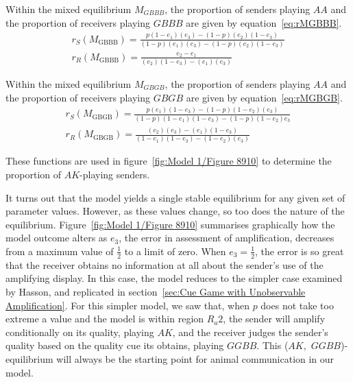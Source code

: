 \documentclass[a4paper,12pt]{article}
\numberwithin{equation}{section}
\begin{document}
Within the mixed equilibrium $M_{GBBB}$, the proportion of senders playing $AA$ and the proportion of receivers playing $GBBB$ are given by equation~\ref{eq:rMGBBB}.
\begin{subequations}
\label{eq:rMGBBB}
\begin{gather}
r_{S}(M_{\text{GBBB}})=\frac{p(1-e_{1})(e_{3})-(1-p)(e_{2})(1-e_{3})}{(1-p)(e_{1})(e_{3})-(1-p)(e_{2})(1-e_{3})}\\
r_{R}(M_{\text{GBBB}})=\frac{e_{2}-e_{1}}{(e_{2})(1-e_{3})-(e_{1})(e_{3})}
\end{gather}
\end{subequations}

Within the mixed equilibrium $M_{GBGB}$, the proportion of senders playing $AA$ and the proportion of receivers playing $GBGB$ are given by equation~\ref{eq:rMGBGB}.
\begin{subequations}
\label{eq:rMGBGB}
\begin{gather}
r_{S}(M_{\text{GBGB}})=\frac{p(e_{1})(1-e_{3})-(1-p)(1-e_{2})(e_{3})}{(1-p)(1-e_{1})(1-e_{3})-(1-p)(1-e_{2})e_{3}}\\
r_{R}(M_{\text{GBGB}})=\frac{(e_{2})(e_{3})-(e_{1})(1-e_{3})}{(1-e_{1})(1-e_{3})-(1-e_{2})(e_{3})}
\end{gather}
\end{subequations}

These functions are used in figure~\ref{fig:Model 1/Figure 8910} to determine the proportion of $AK$-playing senders.

It turns out that the model yields a single stable equilibrium for any given set of parameter values. However, as these values change, so too does the nature of the equilibrium. Figure~\ref{fig:Model 1/Figure 8910} summarises graphically how the model outcome alters as $e_{3}$, the error in assessment of amplification, decreases from a maximum value of $\frac{1}{2}$ to a limit of zero. When $e_{3}=\frac{1}{2}$, the error is so great that the receiver obtains no information at all about the sender's use of the amplifying display. In this case, the model reduces to the simpler case examined by Hasson, and replicated in section~\ref{sec:Cue Game with Unobservable Amplification}. For this simpler model, we saw that, when $p$ does not take too extreme a value and the model is within region $R_{a}2$, the sender will amplify conditionally on its quality, playing $AK$, and the receiver judges the sender's quality based on the quality cue its obtains, playing $GGBB$. This ($AK$,~$GGBB$)-equilibrium will always be the starting point for animal communication in our model.
\end{document}
